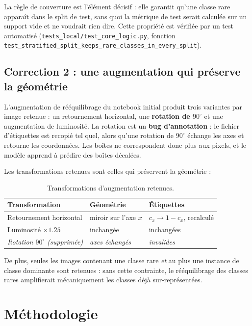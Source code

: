 \documentclass[11pt,a4paper]{article}
\begin{document}
La règle de couverture est l'élément décisif : elle garantit qu'une classe
rare apparaît dans le split de test, sans quoi la métrique de test serait
calculée sur un support vide et ne voudrait rien dire. Cette propriété
est vérifiée par un test automatisé
(\texttt{tests\_local/test\_core\_logic.py}, fonction
       \texttt{test\_stratified\_split\_keeps\_rare\_classes\_in\_every\_split}).

\subsection{Correction 2 : une augmentation qui préserve la géométrie}
\label{sec:aug}

L'augmentation de rééquilibrage du notebook initial produit trois variantes
par image retenue : un retournement horizontal, une \textbf{rotation de
\(90^\circ\)} et une augmentation de luminosité. La rotation est un
\textbf{bug d'annotation} : le fichier d'étiquettes est recopié tel quel,
alors qu'une rotation de \(90^\circ\) échange les axes et retourne les
coordonnées. Les boîtes ne correspondent donc plus aux pixels, et le
modèle apprend à prédire des boîtes décalées.

Les transformations retenues sont celles qui préservent la géométrie :

\begin{table}[H]
\centering
\caption{Transformations d'augmentation retenues.}
\begin{tabular}{@{}p{3.4cm}p{4.3cm}p{5.9cm}@{}}
\toprule
\textbf{Transformation} & \textbf{Géométrie} & \textbf{Étiquettes} \\
\midrule
Retournement horizontal & miroir sur l'axe $x$ & \(c_x \rightarrow 1 - c_x\), recalculé \\
Luminosité \(\times 1.25\) & inchangée & inchangées \\
\midrule
\rowcolor{lightgray}
\emph{Rotation \(90^\circ\) (supprimée)} & \emph{axes échangés} & \emph{invalides} \\
\bottomrule
\end{tabular}
\end{table}

De plus, seules les images contenant une classe rare \emph{et} au plus une
instance de classe dominante sont retenues : sans cette contrainte, le
rééquilibrage des classes rares amplifierait mécaniquement les classes
déjà sur-représentées.

\section{Méthodologie}
\end{document}
